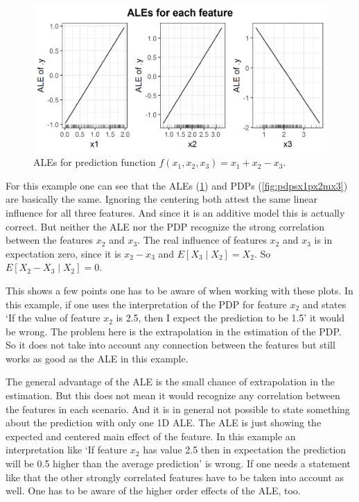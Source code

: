 \documentclass[]{krantz}
\begin{document}
\begin{figure}
\includegraphics[width=1\linewidth]{images/ale_1_ALEs_x1_plus_x2_minus_x3_150_0_2_0p5} \caption{ALEs for prediction function
\(f(x_1, x_2, x_3) = x_1 + x_2 - x_3\).}\label{fig:alesx1px2mx3}
\end{figure}




For this example one can see that the ALEs (\ref{fig:alesx1px2mx3}) and
PDPs (\ref{fig:pdpsx1px2mx3}) are basically the same. Ignoring the
centering both attest the same linear influence for all three features.
And since it is an additive model this is actually correct. But neither
the ALE nor the PDP recognize the strong correlation between the
features \(x_2\) and \(x_3\). The real influence of features \(x_2\) and
\(x_3\) is in expectation zero, since it is \(x_2 - x_3\) and
\(E[X_3 \mid X_2] = X_2\). So \(E[X_2 - X_3 \mid X_2] = 0\).

This shows a few points one has to be aware of when working with these
plots. In this example, if one uses the interpretation of the PDP for
feature \(x_2\) and states `If the value of feature \(x_2\) is 2.5, then
I expect the prediction to be 1.5' it would be wrong. The problem here
is the extrapolation in the estimation of the PDP. So it does not take
into account any connection between the features but still works as good
as the ALE in this example.

The general advantage of the ALE is the small chance of extrapolation in
the estimation. But this does not mean it would recognize any
correlation between the features in each scenario. And it is in general
not possible to state something about the prediction with only one 1D
ALE. The ALE is just showing the expected and centered main effect of
the feature. In this example an interpretation like `If feature \(x_2\)
has value 2.5 then in expectation the prediction will be 0.5 higher than
the average prediction' is wrong. If one needs a statement like that the
other strongly correlated features have to be taken into account as
well. One has to be aware of the higher order effects of the ALE, too.
\end{document}
